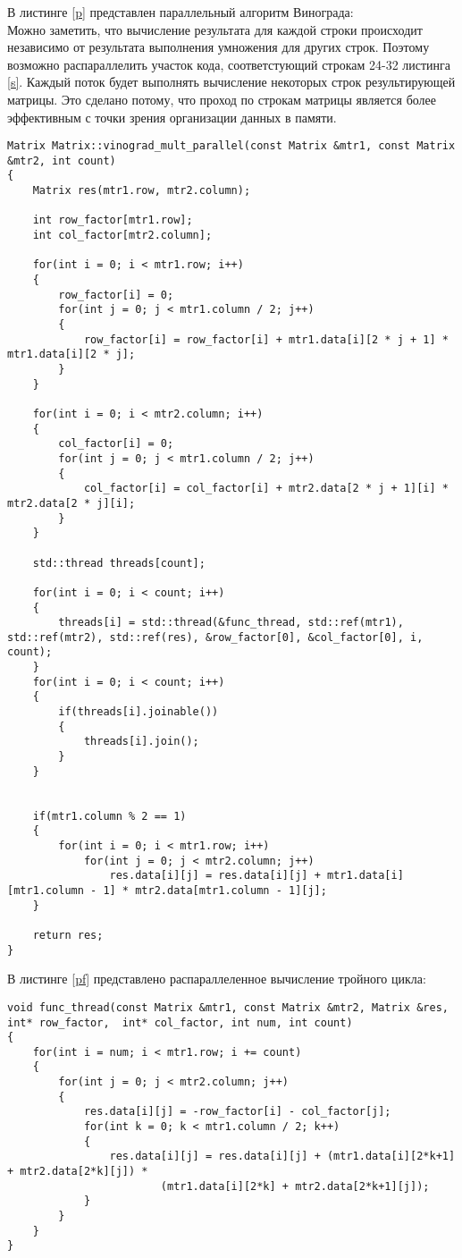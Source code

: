 \documentclass[a4paper, 14pt]{article}
\begin{document}
	В листинге \ref{p} представлен параллельный алгоритм Винограда:\\
	
	Можно заметить, что вычисление результата для каждой строки происходит независимо от результата выполнения умножения для других строк. Поэтому возможно распараллелить участок кода, соответстующий строкам 24-32 листинга \ref{s}. Каждый поток будет выполнять вычисление некоторых строк результирующей матрицы. Это сделано потому, что проход по строкам матрицы является более эффективным с точки зрения организации данных в памяти.

	\begin{lstlisting}[label=p,caption=Параллельный алгоритм Винограда]
Matrix Matrix::vinograd_mult_parallel(const Matrix &mtr1, const Matrix &mtr2, int count)
{
    Matrix res(mtr1.row, mtr2.column);

    int row_factor[mtr1.row];
    int col_factor[mtr2.column];

    for(int i = 0; i < mtr1.row; i++)
    {
        row_factor[i] = 0;
        for(int j = 0; j < mtr1.column / 2; j++)
        {
            row_factor[i] = row_factor[i] + mtr1.data[i][2 * j + 1] * mtr1.data[i][2 * j];
        }
    }

    for(int i = 0; i < mtr2.column; i++)
    {
        col_factor[i] = 0;
        for(int j = 0; j < mtr1.column / 2; j++)
        {
            col_factor[i] = col_factor[i] + mtr2.data[2 * j + 1][i] * mtr2.data[2 * j][i];
        }
    }

    std::thread threads[count];

    for(int i = 0; i < count; i++)
    {
        threads[i] = std::thread(&func_thread, std::ref(mtr1), std::ref(mtr2), std::ref(res), &row_factor[0], &col_factor[0], i, count);
    }
    for(int i = 0; i < count; i++)
    {
        if(threads[i].joinable())
        {
            threads[i].join();
        }
    }


    if(mtr1.column % 2 == 1)
    {
        for(int i = 0; i < mtr1.row; i++)
            for(int j = 0; j < mtr2.column; j++)
                res.data[i][j] = res.data[i][j] + mtr1.data[i][mtr1.column - 1] * mtr2.data[mtr1.column - 1][j];
    }

    return res;
}
\end{lstlisting}

В листинге \ref{pf} представлено распараллеленное вычисление тройного цикла:

	\begin{lstlisting}[label=pf,caption=Распараллеленный тройной цикл]
void func_thread(const Matrix &mtr1, const Matrix &mtr2, Matrix &res,  int* row_factor,  int* col_factor, int num, int count)
{
    for(int i = num; i < mtr1.row; i += count)
    {
        for(int j = 0; j < mtr2.column; j++)
        {
            res.data[i][j] = -row_factor[i] - col_factor[j];
            for(int k = 0; k < mtr1.column / 2; k++)
            {
                res.data[i][j] = res.data[i][j] + (mtr1.data[i][2*k+1] + mtr2.data[2*k][j]) *
                        (mtr1.data[i][2*k] + mtr2.data[2*k+1][j]);
            }
        }
    }
}
\end{lstlisting}
\end{document}
